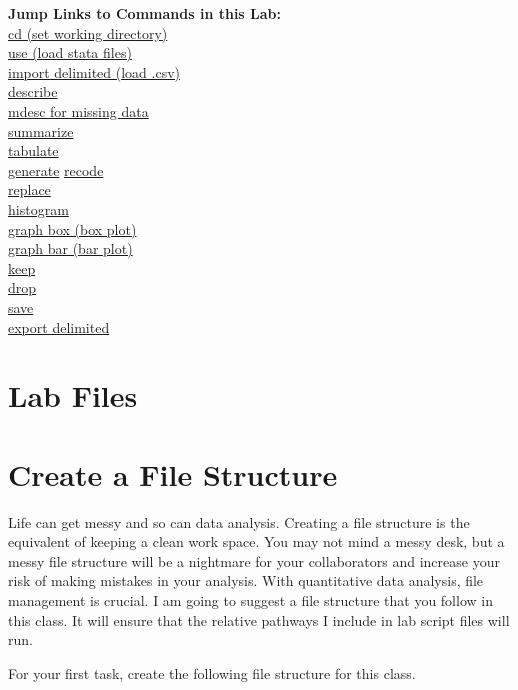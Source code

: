 \documentclass[
]{book}
\begin{document}
\textbf{Jump Links to Commands in this Lab:}\\
\protect\hyperlink{cd}{cd (set working directory)}\\
\protect\hyperlink{use}{use (load stata files)}\\
\protect\hyperlink{use}{import delimited (load .csv)}\\
\protect\hyperlink{describe}{describe}\\
\protect\hyperlink{mdesc}{mdesc for missing data}\\
\protect\hyperlink{summarize}{summarize}\\
\protect\hyperlink{tabulate}{tabulate}\\
\protect\hyperlink{generate}{generate}
\protect\hyperlink{recode}{recode}\\
\protect\hyperlink{replace}{replace}\\
\protect\hyperlink{histogram2}{histogram}\\
\protect\hyperlink{boxplot2}{graph box (box plot)}\\
\protect\hyperlink{barplot2}{graph bar (bar plot)}\\
\protect\hyperlink{keep}{keep}\\
\protect\hyperlink{drop}{drop}\\
\protect\hyperlink{saving}{save}\\
\protect\hyperlink{saving}{export delimited}

\hypertarget{lab-files}{%
\section{Lab Files}\label{lab-files}}

\hypertarget{file}{%
\section{Create a File Structure}\label{file}}

Life can get messy and so can data analysis. Creating a file structure is the equivalent of keeping a clean work space. You may not mind a messy desk, but a messy file structure will be a nightmare for your collaborators and increase your risk of making mistakes in your analysis. With quantitative data analysis, file management is crucial. I am going to suggest a file structure that you follow in this class. It will ensure that the relative pathways I include in lab script files will run.

For your first task, create the following file structure for this class.
\end{document}
